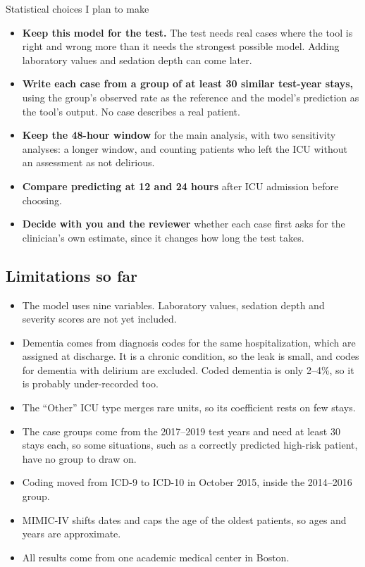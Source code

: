 \documentclass[11pt]{article}
\begin{document}
\begin{plainbox}{Statistical choices I plan to make}
\begin{itemize}
	\item \textbf{Keep this model for the test.} The test needs real cases where the tool is right and wrong more than it needs the strongest possible model. Adding laboratory values and sedation depth can come later.
	\item \textbf{Write each case from a group of at least 30 similar test-year stays,} using the group's observed rate as the reference and the model's prediction as the tool's output. No case describes a real patient.
	\item \textbf{Keep the 48-hour window} for the main analysis, with two sensitivity analyses: a longer window, and counting patients who left the ICU without an assessment as not delirious.
	\item \textbf{Compare predicting at 12 and 24 hours} after ICU admission before choosing.
	\item \textbf{Decide with you and the reviewer} whether each case first asks for the clinician's own estimate, since it changes how long the test takes.
\end{itemize}
\end{plainbox}

\subsection*{Limitations so far}

{\small
\begin{itemize}
	\item The model uses nine variables. Laboratory values, sedation depth and severity scores are not yet included.
	\item Dementia comes from diagnosis codes for the same hospitalization, which are assigned at discharge. It is a chronic condition, so the leak is small, and codes for dementia with delirium are excluded. Coded dementia is only 2--4\%, so it is probably under-recorded too.
	\item The ``Other'' ICU type merges rare units, so its coefficient rests on few stays.
	\item The case groups come from the 2017--2019 test years and need at least 30 stays each, so some situations, such as a correctly predicted high-risk patient, have no group to draw on.
	\item Coding moved from ICD-9 to ICD-10 in October 2015, inside the 2014--2016 group.
	\item MIMIC-IV shifts dates and caps the age of the oldest patients, so ages and years are approximate.
	\item All results come from one academic medical center in Boston.
\end{itemize}
}
\end{document}
